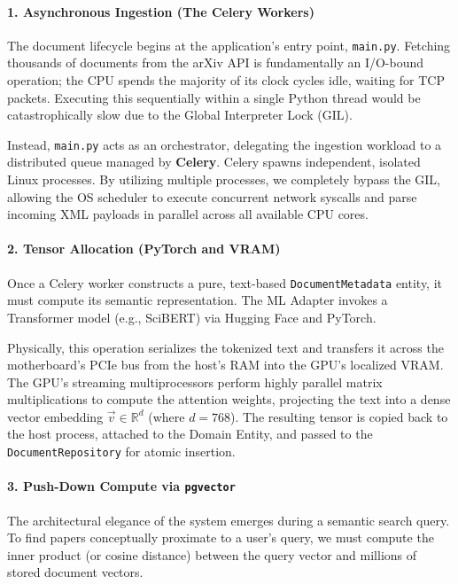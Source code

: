\paragraph{1. Asynchronous Ingestion (The Celery Workers)}
The document lifecycle begins at the application's entry point, \texttt{main.py}. Fetching thousands of documents from the arXiv API is fundamentally an I/O-bound operation; the CPU spends the majority of its clock cycles idle, waiting for TCP packets. Executing this sequentially within a single Python thread would be catastrophically slow due to the Global Interpreter Lock (GIL).

Instead, \texttt{main.py} acts as an orchestrator, delegating the ingestion workload to a distributed queue managed by \textbf{Celery}. Celery spawns independent, isolated Linux processes. By utilizing multiple processes, we completely bypass the GIL, allowing the OS scheduler to execute concurrent network syscalls and parse incoming XML payloads in parallel across all available CPU cores.

\paragraph{2. Tensor Allocation (PyTorch and VRAM)}
Once a Celery worker constructs a pure, text-based \texttt{DocumentMetadata} entity, it must compute its semantic representation. The ML Adapter invokes a Transformer model (e.g., SciBERT) via Hugging Face and PyTorch.

Physically, this operation serializes the tokenized text and transfers it across the motherboard's PCIe bus from the host's RAM into the GPU's localized VRAM. The GPU's streaming multiprocessors perform highly parallel matrix multiplications to compute the attention weights, projecting the text into a dense vector embedding $\vec{v} \in \mathbb{R}^{d}$ (where $d=768$). The resulting tensor is copied back to the host process, attached to the Domain Entity, and passed to the \texttt{DocumentRepository} for atomic insertion.

\paragraph{3. Push-Down Compute via \texttt{pgvector}}
The architectural elegance of the system emerges during a semantic search query. To find papers conceptually proximate to a user's query, we must compute the inner product (or cosine distance) between the query vector and millions of stored document vectors.

